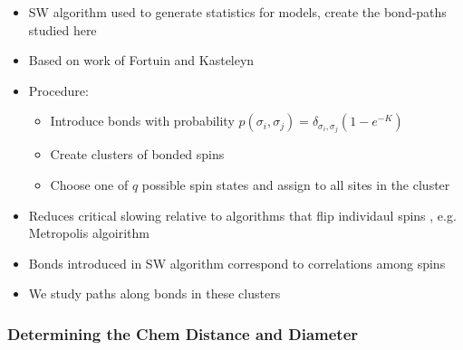 \documentclass[11pt]{article}
\begin{document}
\begin{itemize}

\item SW algorithm \cite{SwWA} used to generate statistics for models, create the bond-paths studied here\\
\label{sec-4.2.1.1}


\item Based on work of Fortuin and Kasteleyn \cite{FoKa}\\
\label{sec-4.2.1.2}


\item Procedure:\\
\label{sec-4.2.1.3}

\begin{itemize}

\item Introduce bonds with probability $p(\sigma_i,\sigma_j) = \delta_{\sigma_i, \sigma_j} (1-e^{-K})$\\
\label{sec-4.2.1.3.1}


\item Create clusters of bonded spins\\
\label{sec-4.2.1.3.2}


\item Choose one of $q$ possible spin states and assign to all sites in the cluster\\
\label{sec-4.2.1.3.3}

\end{itemize} %

\item Reduces critical slowing relative to algorithms that flip individaul spins \cite{NeBa99}, e.g. Metropolis algoirithm \cite{Met}\\
\label{sec-4.2.1.4}


\item Bonds introduced in SW algorithm correspond to correlations among spins\\
\label{sec-4.2.1.5}


\item We study paths along bonds in these clusters\\
\label{sec-4.2.1.6}

\end{itemize} %
\subsubsection{Determining the Chem Distance and Diameter}
\label{sec-4.2.2}
\end{document}
